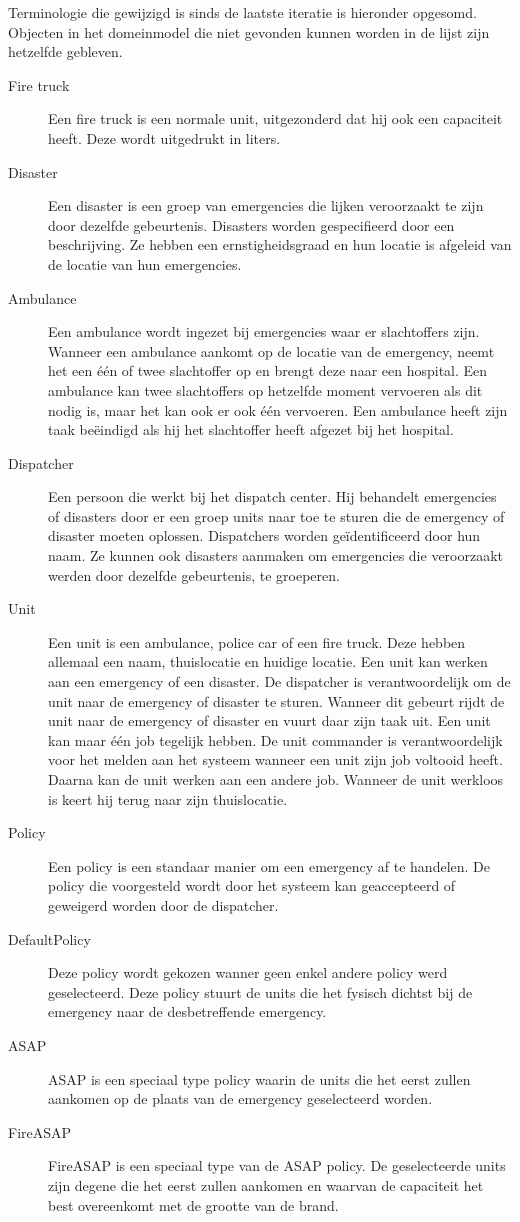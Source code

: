\label{terminologie}
Terminologie die gewijzigd is sinds de laatste iteratie is hieronder opgesomd. Objecten in het domeinmodel die niet gevonden kunnen worden in de lijst zijn hetzelfde gebleven. 
\begin{description}
  \item[Fire truck] Een fire truck is een normale unit, uitgezonderd dat hij ook een capaciteit heeft. Deze wordt uitgedrukt in liters.
  \item[Disaster] Een disaster is een groep van emergencies die lijken veroorzaakt te zijn door dezelfde gebeurtenis. Disasters worden gespecifieerd door een beschrijving. Ze hebben een ernstigheidsgraad en hun locatie is afgeleid van de locatie van hun emergencies.
    \item[Ambulance] Een ambulance wordt ingezet bij emergencies waar er slachtoffers zijn. Wanneer een ambulance aankomt op de locatie van de emergency, neemt het een \'e\'en of twee slachtoffer op en brengt deze naar een hospital. Een ambulance kan twee slachtoffers op hetzelfde moment vervoeren als dit nodig is, maar het kan ook er ook \'e\'en vervoeren. Een ambulance heeft zijn taak be\"eindigd als hij het slachtoffer heeft afgezet bij het hospital.
    \item[Dispatcher] Een persoon die werkt bij het dispatch center. Hij behandelt emergencies of disasters door er een groep units naar toe te sturen die de emergency of disaster moeten oplossen. Dispatchers worden ge\"identificeerd door hun naam. Ze kunnen ook disasters aanmaken om emergencies die veroorzaakt werden door dezelfde gebeurtenis, te groeperen.
        \item[Unit] Een unit is een ambulance, police car of een fire truck. Deze hebben allemaal een naam, thuislocatie en huidige locatie. Een unit kan werken aan een emergency of een disaster. De dispatcher is verantwoordelijk om de unit naar de emergency of disaster te sturen. Wanneer dit gebeurt rijdt de unit naar de emergency of disaster en vuurt daar zijn taak uit. Een unit kan maar \'e\'en job tegelijk hebben. De unit commander is verantwoordelijk voor het melden aan het systeem wanneer een unit zijn job voltooid heeft. Daarna kan de unit werken aan een andere job. Wanneer de unit werkloos is keert hij terug naar zijn thuislocatie.
  \item[Policy]  Een policy is een standaar manier om een emergency af te handelen. De policy die voorgesteld wordt door het systeem kan geaccepteerd of geweigerd worden door de dispatcher.
  \item[DefaultPolicy] Deze policy wordt gekozen wanner geen enkel andere policy werd geselecteerd. Deze policy stuurt de units die het fysisch dichtst bij de emergency naar de desbetreffende emergency.
  \item[ASAP] ASAP is een speciaal type policy waarin de units die het eerst zullen aankomen op de plaats van de emergency geselecteerd worden.
  \item[FireASAP] FireASAP is een speciaal type van de ASAP policy. De geselecteerde units zijn degene die het eerst zullen aankomen en waarvan de capaciteit het best overeenkomt met de grootte van de brand.
\end{description}
